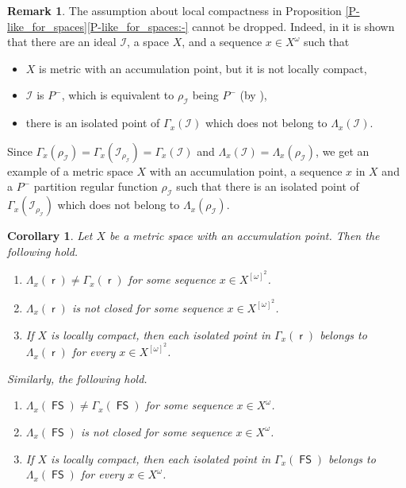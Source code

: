\documentclass{amsart}
\theoremstyle{plain}
\newtheorem{corollary}[thm]{Corollary}
\theoremstyle{definition}
\newtheorem{remark}[thm]{Remark}
\theoremstyle{remark}
\newcommand{\cI}{\mathcal{I}}
\newcommand{\I}{\cI}
\DeclareMathOperator{\FS}{\mathsf{FS}}
\DeclareMathOperator{\rr}{\mathsf{r}}
\begin{document}
\begin{remark}
The assumption about local compactness in Proposition \ref{P-like_for_spaces}\ref{P-like_for_spaces:-} cannot be dropped. Indeed, in \cite[Example 3.8]{FKL24} it is shown that there are an ideal $\I$, a space $X$, and a sequence $x\in X^\omega$ such that
\begin{itemize}
    \item $X$ is metric with an accumulation point, but it is not locally compact,
    \item $\I$ is $P^-$, which is equivalent to $\rho_\I$ being $P^-$ (by \cite[Proposition 6.5(2)]{FKK23}),
    \item there is an isolated point of $\Gamma_x(\I)$ which does not belong to $\Lambda_x(\I)$.
\end{itemize}
Since $\Gamma_x(\rho_\I)=\Gamma_x(\I_{\rho_\I})=\Gamma_x(\I)$ and $\Lambda_x(\I)=\Lambda_x(\rho_\I)$, we get an example of a metric space $X$ with an accumulation point, a sequence $x$ in $X$ and a $P^-$ partition regular function $\rho_\I$ such that there is an isolated point of $\Gamma_x(\I_{\rho_\I})$ which does not belong to $\Lambda_x(\rho_\I)$.
\end{remark}

\begin{corollary}\label{cor:ojshdgkjshg}
Let $X$ be a metric space with an accumulation point. Then the following hold. 
\begin{enumerate}[label={\rm (\roman{*})}]
\item $\Lambda_x(\rr)\neq\Gamma_x(\rr)$  for some sequence $x\in X^{[\omega]^2}$\textup{.}
\item $\Lambda_x(\rr)$ is not closed for some sequence $x\in X^{[\omega]^2}$\textup{.}
\item If $X$ is locally compact, then each isolated point in $\Gamma_x(\rr)$ belongs to $\Lambda_x(\rr)$ for every $x\in X^{[\omega]^2}$.
\end{enumerate}
Similarly, the following hold.
\begin{enumerate}[label={\rm (\roman{*}$^\prime$)}]
\item $\Lambda_x(\FS)\neq\Gamma_x(\FS)$ for some sequence $x\in X^{\omega}$\textup{.}
\item $\Lambda_x(\FS)$ is not closed for some sequence $x\in X^{\omega}$\textup{.}
\item If $X$ is locally compact, then each isolated point in $\Gamma_x(\FS)$ belongs to $\Lambda_x(\FS)$ for every $x\in X^{\omega}$.
\end{enumerate}
\end{corollary}
\end{document}
